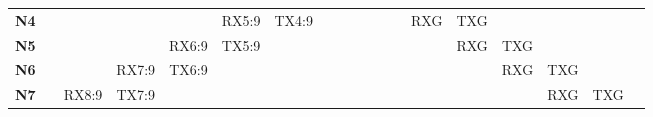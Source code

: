 \documentclass{tfgitic}[2024/07/01]
\begin{document}
\begin{figure}
{\begin{tabular}{l||cccccccccccccccccc}
            \hhline{~||~~~~---~~~~---~~~~}
            \textbf{N4} &                          &                            &                            & \multicolumn{1}{c|}{}      & \multicolumn{1}{c|}{RX5:9} & \multicolumn{1}{c|}{TX4:9} &                            &                            &                            &                                                              &                                                              & \multicolumn{1}{c|}{}                                        & \multicolumn{1}{c|}{{\cellcolor[rgb]{0.753,0.749,0.737}}RXG} & \multicolumn{1}{c|}{TXG} &                          &                          &                          &                           \\ 
            \cline{5-7}\cline{14-16}
            \textbf{N5} &                          &                            & \multicolumn{1}{c|}{}      & \multicolumn{1}{c|}{RX6:9} & \multicolumn{1}{c|}{TX5:9} &                            &                            &                            &                            &                                                              &                                                              &                                                              & \multicolumn{1}{c|}{}                                        & \multicolumn{1}{c|}{RXG} & \multicolumn{1}{c|}{TXG} &                          &                          &                           \\ 
            \cline{4-6}\cline{15-17}
            \textbf{N6} &                          & \multicolumn{1}{c|}{}      & \multicolumn{1}{c|}{RX7:9} & \multicolumn{1}{c|}{TX6:9} &                            &                            &                            &                            &                            &                                                              &                                                              &                                                              &                                                              & \multicolumn{1}{c|}{}    & \multicolumn{1}{c|}{RXG} & \multicolumn{1}{c|}{TXG} &                          &                           \\ 
            \cline{3-5}\cline{16-18}
            \textbf{N7} & \multicolumn{1}{c|}{}    & \multicolumn{1}{c|}{RX8:9} & \multicolumn{1}{c|}{TX7:9} &                            &                            &                            &                            &                            &                            &                                                              &                                                              &                                                              &                                                              &                          & \multicolumn{1}{c|}{}    & \multicolumn{1}{c|}{RXG} & \multicolumn{1}{c|}{TXG} &                           \\ 

\end{tabular}}
\end{figure}
\end{document}
